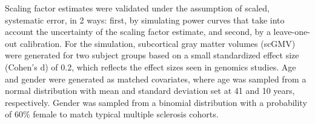 Scaling factor estimates were validated under the assumption of scaled, systematic error, in 2 ways: first, by simulating power curves that take into account the uncertainty of the scaling factor estimate, and second, by a leave-one-out calibration. For the simulation, subcortical gray matter volumes (scGMV) were generated for two subject groups based on a small standardized effect size (Cohen's d) of 0.2, which reflects the effect sizes seen in genomics studies. Age and gender were generated as matched covariates, where age was sampled from a normal distribution with mean and standard deviation set at 41 and 10 years, respectively. Gender was sampled from a binomial distribution with a probability of 60\% female to match typical multiple sclerosis cohorts. %